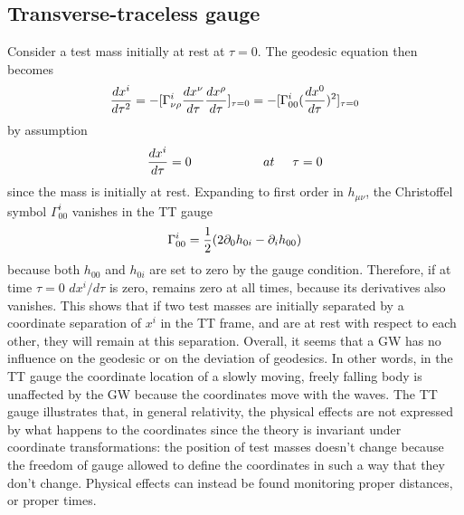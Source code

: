\documentclass[binding=0.6cm, LaM]{sapthesis}
\begin{document}
\subsection{Transverse-traceless gauge}

Consider a test mass initially at rest at $\tau = 0$. The geodesic equation then becomes
\begin{equation}
{{dx^i}\over{d\tau^2}} = -[\Gamma^i_{\nu\rho}{{dx^{\nu}}\over{d\tau}}{{dx^{\rho}}\over{d\tau}}]_{\tau=0} \\ 
= - [ \Gamma^i_{00}({{dx^0}\over{d\tau}})^2]_{\tau=0}
\end{equation}
by assumption
\begin{equation}
{{dx^i}\over{d\tau}} = 0 \hspace*{2cm} at \hspace*{0.5cm}\tau = 0
\end{equation}
since the mass is initially at rest. Expanding to first order in $h_{\mu\nu}$, the Christoffel symbol $\Gamma^i_{00}$ vanishes in the TT gauge
\begin{equation}
 \Gamma^i_{00} = {1 \over {2}}(2\partial_{0}h_{0i} - \partial_i h_{00})
\end{equation}
because both $h_{00}$ and $h_{0i}$ are set to zero by the gauge condition. Therefore, if at time $\tau = 0$ $dx^i/d\tau$ is zero, remains zero at all times, because its derivatives also vanishes. 
This shows that if two test masses are initially separated by a coordinate separation of $x^i$ in the TT frame, and are at rest with respect to each other, they will remain at this separation. 
Overall, it seems that a GW has no influence on the geodesic or on the deviation of geodesics. 
In other words, in the TT gauge the coordinate location of a slowly moving, freely falling body is unaffected by the GW because the coordinates move with the waves.
The TT gauge illustrates that, in general relativity, the physical effects are not expressed by what happens to the coordinates since the theory is invariant under coordinate transformations:
 the position of test masses doesn't change because the freedom of gauge allowed to define the coordinates in such a way that they don't change. 
Physical effects can instead be found monitoring proper distances, or proper times. 
\end{document}
